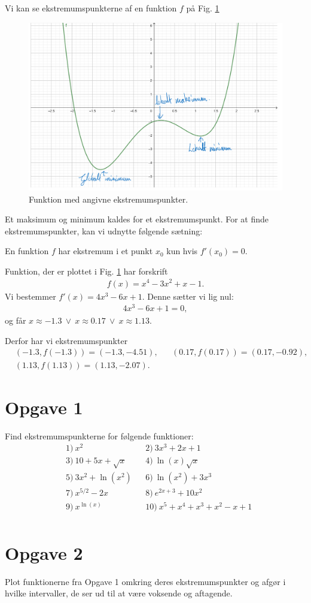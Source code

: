 Vi kan se ekstremumspunkterne af en funktion $f$ på Fig. \ref{fig:ekstremum}
\begin{figure}[H]
\includegraphics[width=\textwidth]{Billeder/ekstremum2.png}
\caption{Funktion med angivne ekstremumspunkter.}
\label{fig:ekstremum}
\end{figure}
Et maksimum og minimum kaldes for et ekstremumspunkt.
For at finde ekstremumspunkter, kan vi udnytte følgende sætning:
\begin{setn}
En funktion $f$ har ekstremum i et punkt $x_0$ kun hvis $f'(x_0) = 0$.
\end{setn}
\begin{exa}
Funktion, der er plottet i Fig. \ref{fig:ekstremum} har forskrift
\begin{align*}
f(x) = x^4-3x^2+x-1.
\end{align*}
Vi bestemmer $f'(x) = 4x^3-6x+1$. Denne sætter vi lig nul:
\begin{align*}
4x^3-6x+1 = 0,
\end{align*}
og får $x \approx -1.3 \ \vee\  x \approx 0.17 \ \vee \ x \approx 1.13$. 

Derfor har vi ekstremumspunkter
\begin{align*}
&(-1.3,f(-1.3)) = (-1.3,-4.51), &&(0.17,f(0.17)) = (0.17,-0.92),  \\ &(1.13,f(1.13))=(1.13,-2.07).
\end{align*} 
\end{exa}

\section*{Opgave 1}
Find ekstremumspunkterne for følgende funktioner:
\begin{align*}
&1) \ x^2    &&2) \ 3x^3+2x+1    \\
&3) \ 10 + 5x+ \sqrt{x}   &&4) \ \ln(x)\sqrt{x}   \\
&5) \  3x^2+\ln(x^2)  &&6) \  \ln(x^2)+3x^3  \\
&7) \ x^{5/2}-2x    &&8) \  e^{2x+3} +10x^2  \\
&9) \ x^{\ln(x)}   &&10) \  x^5+x^4+x^3+x^2-x+1  \\
\end{align*}
\section*{Opgave 2}
Plot funktionerne fra Opgave 1 omkring deres ekstremumspunkter og afgør i hvilke intervaller, de ser ud til at være voksende og aftagende.